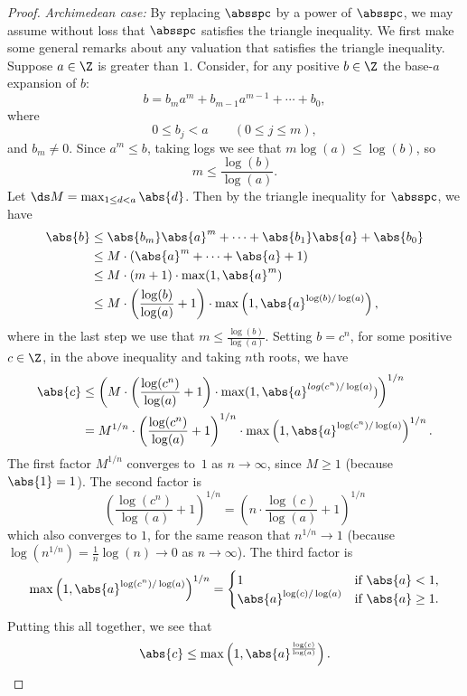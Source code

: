 \documentclass[11pt]{book}
\begin{document}
\begin{ch}
\begin{proof}
{\em Archimedean case:} By replacing $\absspc$ by a power of
$\absspc$, we may assume without loss that $\absspc$ satisfies the
triangle inequality.  We first make some general remarks about any
valuation that satisfies the triangle inequality.
Suppose $a\in\Z$ is greater than $1$.  Consider, for any positive $b\in\Z$
the base-$a$ expansion of $b$:
$$
  b = b_m a^m + b_{m-1} a^{m-1} + \cdots + b_0,
$$
where
$$
  0 \leq b_j < a \qquad (0\leq j \leq m),
$$
and $b_m\neq 0$.
Since $a^m\leq b$, taking logs we see that
$m\log(a)\leq \log(b)$, so
$$m \leq \frac{\log(b)}{\log(a)}.$$
Let $\ds M=\max_{1\leq d<a}\abs{d}$.  Then by the triangle
inequality for $\absspc$, we have
\begin{align*}
\abs{b}&\leq \abs{b_m}\abs{a}^m + \cdots + \abs{b_1}\abs{a} + \abs{b_0}\\
    & \leq M\cdot (\abs{a}^m + \cdots + \abs{a} + 1)\\
   & \leq M\cdot (m+1)\cdot \max(1,\abs{a}^m)\\
   & \leq M\cdot\left(\frac{\log(b)}{\log(a)} + 1\right)
        \cdot \max\left(1,\abs{a}^{\log(b)/\log(a)}\right),
\end{align*}
where in the last step we use that $m\leq \frac{\log(b)}{\log(a)}$.
Setting $b=c^n$, for some positive $c\in\Z$, in the above inequality and
taking $n$th roots, we have
\begin{align*}
\abs{c} &\leq \left( M\cdot
\left(\frac{\log(c^n)}{\log(a)}+1\right)\cdot
  \max(1,\abs{a}^{log(c^n)/\log(a)})\right)^{1/n}\\
  & = M^{1/n}\cdot\left(
       \frac{\log(c^n)}{\log(a)}+1\right)^{1/n}\cdot
      \max\left(1,\abs{a}^{\log(c^n)/\log(a)}\right)^{1/n}.
\end{align*}
The first factor $M^{1/n}$ converges to~$1$ as $n\to\infty$,
since $M\geq 1$ (because $\abs{1}=1$).  The second factor
is
$$
  \left(\frac{\log(c^n)}{\log(a)}+1\right)^{1/n}
   =
\left(n \cdot \frac{\log(c)}{\log(a)}+1\right)^{1/n}
$$
which also converges to $1$, for the
same reason that $n^{1/n}\to 1$
(because $\log(n^{1/n})=\frac{1}{n}\log(n)\to 0$ as
$n\to\infty$).
The third factor is
$$
\max\left(1,\abs{a}^{\log(c^n)/\log(a)}\right)^{1/n}
  = \begin{cases}
   1 & \text{if }\abs{a}<1,\\
\abs{a}^{\log(c)/\log(a)} & \text{if }\abs{a}\geq 1.
\end{cases}
$$
Putting this all together, we see that
$$
\abs{c} \leq \max\left(1,\abs{a}^{\frac{\log(c)}{\log(a)}}\right).
$$


\end{proof}
\end{ch}
\end{document}
